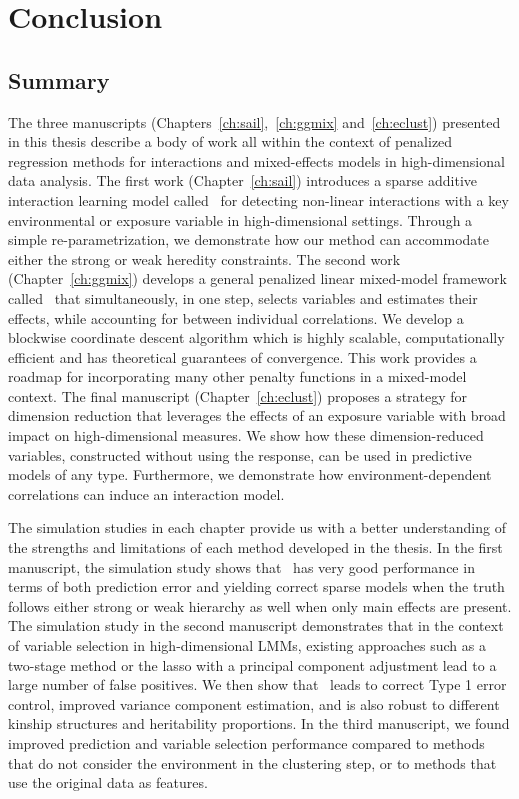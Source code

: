 \chapter{Conclusion\label{ch:conclusion}}

\section{Summary}
The three manuscripts (Chapters~\ref{ch:sail},~\ref{ch:ggmix} and~\ref{ch:eclust}) presented in this thesis describe a body of work all within the context of penalized regression methods for interactions and mixed-effects models in high-dimensional data analysis. The first work (Chapter~\ref{ch:sail}) introduces a sparse additive interaction learning model called \sail ~for detecting non-linear interactions with a key environmental or exposure variable in high-dimensional settings. Through a simple re-parametrization, we demonstrate how our method can accommodate either the strong or weak heredity constraints. The second work (Chapter~\ref{ch:ggmix}) develops a general penalized linear mixed-model framework called \ggmix ~that simultaneously, in one step, selects variables and estimates their effects, while accounting for between individual correlations. We develop a blockwise coordinate descent algorithm which is highly scalable, computationally efficient and has theoretical guarantees of convergence. This work provides a roadmap for incorporating many other penalty functions in a mixed-model context. The final manuscript (Chapter~\ref{ch:eclust}) proposes a strategy for dimension reduction that leverages the effects of an exposure variable with
broad impact on high-dimensional measures. We show how these dimension-reduced variables, constructed without using the response, can be used in predictive models of any type. Furthermore, we demonstrate how environment-dependent correlations can induce an interaction model. 

The simulation studies in each chapter provide us with a better understanding of the strengths and limitations of each method developed in the thesis. In the first manuscript, the simulation study shows that \sail ~has very good performance in terms of both prediction error and yielding correct sparse models when the truth follows either strong or weak hierarchy as well when only main effects are present. The simulation study in the second manuscript demonstrates that in the context of variable selection in high-dimensional LMMs, existing approaches such as a two-stage method or the lasso with a principal component adjustment lead to a large number of false positives. We then show that \ggmix ~leads to correct Type 1 error control, improved variance component estimation, and is also robust to different kinship structures and heritability proportions. In the third manuscript, we found improved prediction and variable selection performance compared to methods that do not consider the environment in the clustering step, or to methods that use the original data as features.

